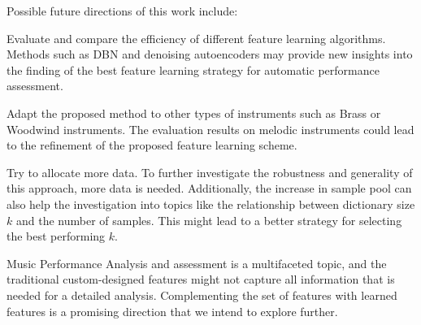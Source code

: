 \documentclass{article}
\begin{document}
Possible future directions of this work include: 
\begin{inparaenum}[(i)]
    \item   Evaluate and compare the efficiency of different feature learning algorithms. Methods such as DBN\cite{Hamel2010} and denoising autoencoders \cite{Vincent2008} may provide new insights into the finding of the best feature learning strategy for automatic performance assessment.
    \item   Adapt the proposed method to other types of instruments such as Brass or Woodwind instruments. The evaluation results on melodic instruments could lead to the refinement of the proposed feature learning scheme. 
    \item   Try to allocate more data. To further investigate the robustness and generality of this approach, more data is needed. Additionally, the increase in sample pool can also help the investigation into topics like the relationship between dictionary size $k$ and the number of samples. This might lead to a better strategy for selecting the best performing $k$. 
\end{inparaenum}

Music Performance Analysis and assessment is a multifaceted topic, and the traditional custom-designed features might not capture all information that is needed for a detailed analysis. Complementing the set of features with learned features is a promising direction that we intend to explore further.

\end{document}
